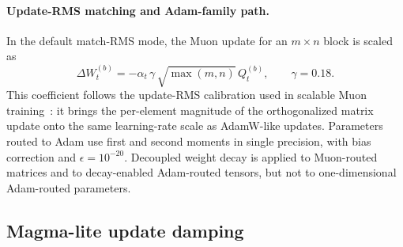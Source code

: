 \paragraph{Update-RMS matching and Adam-family path.}
In the default match-RMS mode, the Muon update for an $m\times n$ block is
scaled as
\begin{equation}
    \Delta W_t^{(b)}
    =
    -\alpha_t\,\gamma\,\sqrt{\max(m,n)}\,Q_t^{(b)},
    \qquad \gamma=0.18.
    \label{eq:sm-match-rms}
\end{equation}
This coefficient follows the update-RMS calibration used in scalable Muon training~\cite{liu2025muon}: it brings the per-element magnitude of the orthogonalized matrix update onto the same learning-rate scale as AdamW-like updates.
Parameters routed to Adam use first and second moments in single precision, with bias correction and $\epsilon=10^{-20}$.
Decoupled weight decay is applied to Muon-routed matrices and to decay-enabled Adam-routed tensors, but not to one-dimensional Adam-routed parameters.

\subsection{Magma-lite update damping}
\label{sec:sm-magma-lite}


